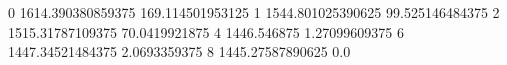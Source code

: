 0 1614.390380859375 169.114501953125
1 1544.801025390625 99.525146484375
2 1515.31787109375 70.0419921875
4 1446.546875 1.27099609375
6 1447.34521484375 2.0693359375
8 1445.27587890625 0.0
